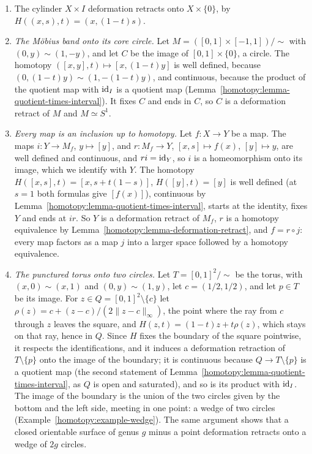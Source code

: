 \begin{example}\label{homotopy:example-deformation-retracts}
\begin{enumerate}
\item The cylinder $X \times I$ deformation retracts onto $X \times \{0\}$, by $H((x, s), t) = (x, (1 - t)s)$.
\item \emph{The M\"obius band onto its core circle.} Let $M = ([0, 1] \times [-1, 1])/\sim$ with $(0, y) \sim (1, -y)$, and let $C$ be the image of
$[0, 1] \times \{0\}$, a circle. The homotopy $([x, y], t) \mapsto [x, (1 - t)y]$ is well defined, because $(0, (1 - t)y) \sim (1, -(1 - t)y)$, and continuous,
because the product of the quotient map with $\mathrm{id}_I$ is a quotient map (Lemma~\ref{homotopy:lemma-quotient-times-interval}). It fixes $C$ and ends in $C$, so
$C$ is a deformation retract of $M$ and $M \simeq S^1$.
\item \emph{Every map is an inclusion up to homotopy.} Let $f \colon X \to Y$ be a map. The maps $i \colon Y \to M_f$, $y \mapsto [y]$, and
$r \colon M_f \to Y$, $[x, s] \mapsto f(x)$, $[y] \mapsto y$, are well defined and continuous, and $ri = \mathrm{id}_Y$, so $i$ is a homeomorphism onto its image, which
we identify with $Y$. The homotopy $H([x, s], t) = [x, s + t(1 - s)]$, $H([y], t) = [y]$ is well defined (at $s = 1$ both formulas give $[f(x)]$), continuous
by Lemma~\ref{homotopy:lemma-quotient-times-interval}, starts at the identity, fixes $Y$ and ends at $ir$. So $Y$ is a deformation retract of $M_f$, $r$ is a
homotopy equivalence by Lemma~\ref{homotopy:lemma-deformation-retract}, and $f = r \circ j$: every map factors as a map $j$ into a larger space followed by a
homotopy equivalence.
\item \emph{The punctured torus onto two circles.} Let $T = [0, 1]^2/\sim$ be the torus, with $(x, 0) \sim (x, 1)$ and $(0, y) \sim (1, y)$, let $c = (1/2, 1/2)$,
and let $p \in T$ be its image. For $z \in Q = [0, 1]^2 \setminus \{c\}$ let $\rho(z) = c + (z - c)/(2\|z - c\|_\infty)$, the point where the ray from $c$
through $z$ leaves the square, and $H(z, t) = (1 - t)z + t\rho(z)$, which stays on that ray, hence in $Q$. Since $H$ fixes the boundary of the square
pointwise, it respects the identifications, and it induces a deformation retraction of $T \setminus \{p\}$ onto the image of the boundary; it is continuous
because $Q \to T \setminus \{p\}$ is a quotient map (the second statement of Lemma~\ref{homotopy:lemma-quotient-times-interval}, as $Q$ is open and
saturated), and so is its product with $\mathrm{id}_I$. The image of the boundary is the union of the two circles given by the bottom and the left side, meeting in one
point: a wedge of two circles (Example~\ref{homotopy:example-wedge}). The same argument shows that a closed orientable surface of genus $g$ minus a point
deformation retracts onto a wedge of $2g$ circles.
\end{enumerate}
\end{example}

